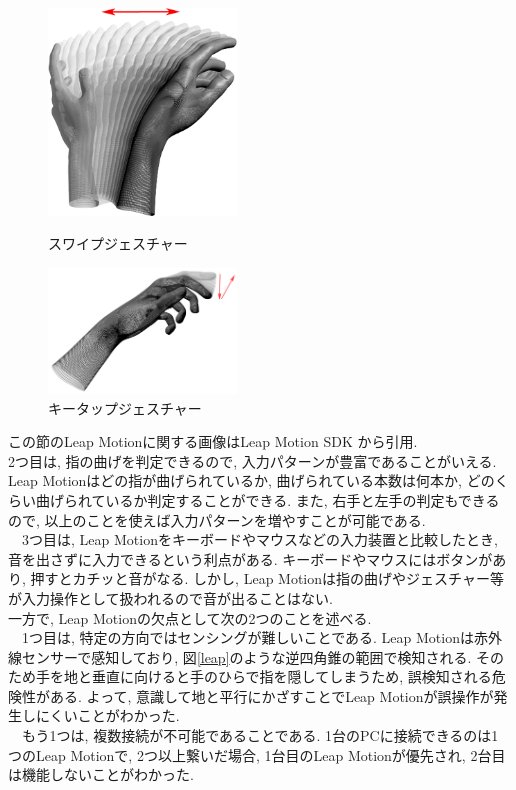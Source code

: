\documentclass{funthesis}
\begin{document}
\begin{figure}[H]
 \begin{minipage}{0.5\hsize}
  \begin{center}
  \includegraphics[width=50mm]{./img/Swipe.png}
  \end{center}
  \caption{スワイプジェスチャー}
  \label{swipe}
 \end{minipage}
 \begin{minipage}{0.5\hsize}
  \begin{center}
  \includegraphics[width=50mm]{./img/KeyTap.png}
  \end{center}
  \caption{キータップジェスチャー}
  \label{keytap}
 \end{minipage}
\end{figure}
この節のLeap Motionに関する画像はLeap Motion SDK から引用.\\
 
  2つ目は, 指の曲げを判定できるので, 入力パターンが豊富であることがいえる. Leap Motionはどの指が曲げられているか, 曲げられている本数は何本か, どのくらい曲げられているか判定することができる. また, 右手と左手の判定もできるので, 以上のことを使えば入力パターンを増やすことが可能である. \\
  　3つ目は, Leap Motionをキーボードやマウスなどの入力装置と比較したとき, 音を出さずに入力できるという利点がある. キーボードやマウスにはボタンがあり, 押すとカチッと音がなる. しかし, Leap Motionは指の曲げやジェスチャー等が入力操作として扱われるので音が出ることはない. \\ 
  一方で, Leap Motionの欠点として次の2つのことを述べる.\\ 
  　1つ目は, 特定の方向ではセンシングが難しいことである. Leap Motionは赤外線センサーで感知しており,  図\ref{leap}のような逆四角錐の範囲で検知される. そのため手を地と垂直に向けると手のひらで指を隠してしまうため, 誤検知される危険性がある. よって, 意識して地と平行にかざすことでLeap Motionが誤操作が発生しにくいことがわかった.\\
  　もう1つは, 複数接続が不可能であることである. 1台のPCに接続できるのは1つのLeap Motionで, 2つ以上繋いだ場合, 1台目のLeap Motionが優先され, 2台目は機能しないことがわかった.\\ 
 
\end{document}
